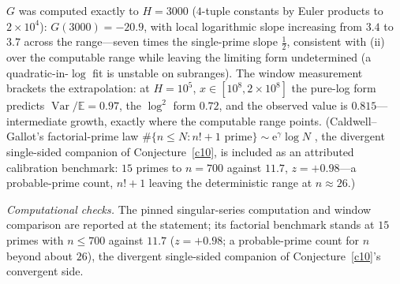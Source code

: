 \documentclass[11pt]{article}
\theoremstyle{definition}
\newcommand{\e}{\mathrm{e}}
\begin{document}
$G$ was computed exactly to $H=3000$ ($4$-tuple constants by Euler
products to $2\times10^4$): $G(3000)=-20.9$, with local logarithmic
slope increasing from $3.4$ to $3.7$ across the range---seven times
the single-prime slope $\tfrac12$, consistent with (ii) over the
computable range while leaving the limiting form undetermined (a
quadratic-in-$\log$ fit is unstable on subranges).
The window measurement brackets the extrapolation: at $H=10^5$,
$x\in[10^8,2\times10^8]$ the pure-log form predicts
$\operatorname{Var}/\mathbb E=0.97$, the $\log^2$ form $0.72$, and
the observed value is $0.815$---intermediate growth, exactly where
the computable range points.  (Caldwell--Gallot's factorial-prime law
$\#\{n\le N: n!+1 \text{ prime}\}\sim\e^{\gamma}\log N$
\cite{CaldwellGallot}, the divergent single-sided companion of
Conjecture~\ref{c10}, is included as an attributed calibration
benchmark: $15$ primes to $n=700$ against $11.7$,
$z=+0.98$---a probable-prime count, $n!+1$ leaving the deterministic
range at $n\approx26$.)

\emph{Computational checks.}  The pinned singular-series computation and window
comparison are reported at the statement; its factorial
benchmark stands at $15$ primes with $n\le700$ against $11.7$
($z=+0.98$; a probable-prime count for $n$ beyond about $26$), the
divergent single-sided companion of
Conjecture~\ref{c10}'s convergent side.
\end{document}
